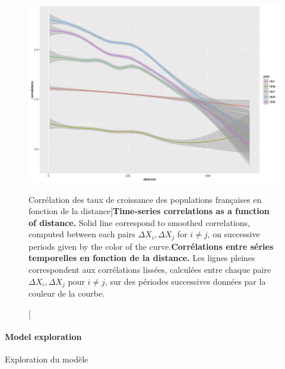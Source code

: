 \begin{figure}
\includegraphics[width=\linewidth]{Figures/Final/4-3-2-fig-interactiongibrat-ts-correlations}
\caption[Correlation of French population growth rates as a function of distance][Corrélation des taux de croissance des populations françaises en fonction de la distance]{\textbf{Time-series correlations as a function of distance.} Solid line correspond to smoothed correlations, computed between each pairs $\Delta X_i,\Delta X_j$ for $i\neq j$, on successive periods given by the color of the curve.\label{fig:interactiongibrat:ts-correlations}}{\textbf{Corrélations entre séries temporelles en fonction de la distance.} Les lignes pleines correspondent aux corrélations lissées, calculées entre chaque paire $\Delta X_i,\Delta X_j$ pour $i\neq j$, sur des périodes successives données par la couleur de la courbe.\label{fig:interactiongibrat:ts-correlations}}
\end{figure}




\paragraph{Model exploration}{Exploration du modèle}




